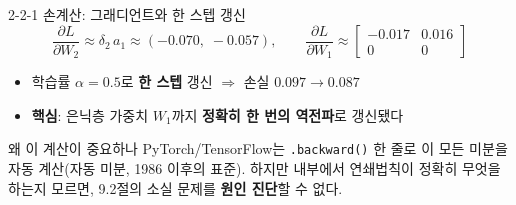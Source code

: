 \begin{frame}{2-2-1 손계산: 그래디언트와 한 스텝 갱신}
  \small
  \[
  \frac{\partial L}{\partial W_2} \approx \delta_2 \, a_1 \approx (-0.070,\; -0.057),
  \qquad
  \frac{\partial L}{\partial W_1} \approx
  \begin{bmatrix} -0.017 & 0.016 \\ 0 & 0 \end{bmatrix}
  \]
  \begin{itemize}
    \item 학습률 $\alpha = 0.5$로 \textbf{한 스텝} 갱신 $\Rightarrow$
      손실 $0.097 \to 0.087$
    \item \textbf{핵심}: 은닉층 가중치 $W_1$까지 \textbf{정확히 한 번의
      역전파}로 갱신됐다
  \end{itemize}
  \begin{block}{왜 이 계산이 중요하나}
    PyTorch/TensorFlow는 \texttt{.backward()} 한 줄로 이 모든 미분을
    자동 계산(자동 미분, 1986 이후의 표준). 하지만 내부에서
    연쇄법칙이 정확히 무엇을 하는지 모르면, 9.2절의 소실 문제를
    \textbf{원인 진단}할 수 없다.
  \end{block}
\end{frame}
